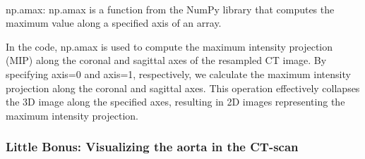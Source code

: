 \documentclass[11pt]{article}
\begin{document}
    \begin{center}
    \end{center}
    { \hspace*{\fill} \\}
    
    np.amax: np.amax is a function from the NumPy library that computes the
maximum value along a specified axis of an array.

In the code, np.amax is used to compute the maximum intensity projection
(MIP) along the coronal and sagittal axes of the resampled CT image. By
specifying axis=0 and axis=1, respectively, we calculate the maximum
intensity projection along the coronal and sagittal axes. This operation
effectively collapses the 3D image along the specified axes, resulting
in 2D images representing the maximum intensity projection.

    \hypertarget{little-bonus-visualizing-the-aorta-in-the-ct-scan}{%
\subsubsection{Little Bonus: Visualizing the aorta in the
CT-scan}\label{little-bonus-visualizing-the-aorta-in-the-ct-scan}}
\end{document}
